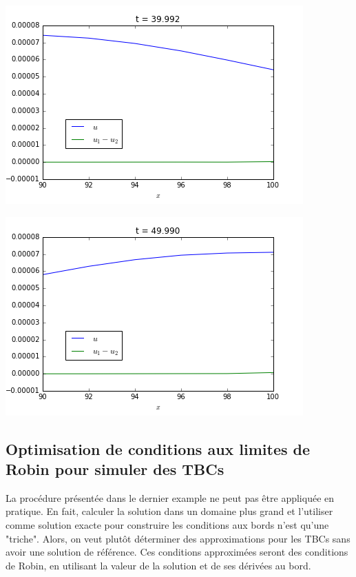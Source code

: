 \begingroup
\noindent
	\begin{minipage}{.45\linewidth}
		\includegraphics[scale=.5]{figures/motivational2A.png}	
	\end{minipage}
	\hfill
	\begin{minipage}{.45\linewidth}
		\includegraphics[scale=.5]{figures/motivational2B.png}	
	\end{minipage}
\endgroup

\subsection{Optimisation de conditions aux limites de Robin pour simuler des TBCs}

\indent La procédure présentée dans le dernier example ne peut pas être appliquée en pratique. En fait, calculer la solution dans un domaine plus grand et l'utiliser comme solution exacte pour construire les conditions aux bords n'est qu'une "triche". Alors, on veut plutôt déterminer des approximations pour les TBCs sans avoir une solution de référence. Ces conditions approximées seront des conditions de Robin, en utilisant la valeur de la solution et de ses dérivées au bord.

